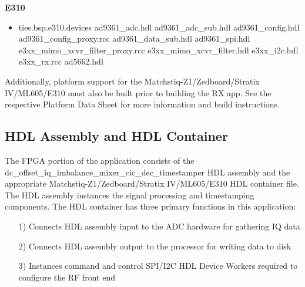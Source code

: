 	\begin{minipage}[t]{.33\textwidth}
	\textbf{E310}
	\begin{itemize}
		\item ties.bsp.e310.devices
			\subitem ad9361\_adc.hdl
			\subitem ad9361\_adc\_sub.hdl
			\subitem ad9361\_config.hdl
			\subitem ad9361\_config\_proxy.rcc
			\subitem ad9361\_data\_sub.hdl
			\subitem ad9361\_spi.hdl
			\subitem e3xx\_mimo\_xcvr\_filter\_proxy.rcc
			\subitem e3xx\_mimo\_xcvr\_filter.hdl
			\subitem e3xx\_i2c.hdl
			\subitem e3xx\_rx.rcc
			\subitem ad5662.hdl
	\end{itemize}
	\end{minipage} \medskip



\noindent Additionally, platform support for the Matchstiq-Z1/Zedboard/Stratix IV/ML605/E310 must also be built prior to building the RX app. See the respective Platform Data Sheet for more information and build instructions.
\newpage

\subsection{HDL Assembly and HDL Container}
The FPGA portion of the application consists of the dc\_offset\_iq\_imbalance\_mixer\_cic\_dec\_timestamper HDL assembly and the appropriate  Matchstiq-Z1/Zedboard/Stratix IV/ML605/E310 HDL container file. The HDL assembly instances the signal processing and timestamping components. The HDL container has three primary functions in this application:
\begin{itemize}
	\item[1)] Connects HDL assembly input to the ADC hardware for gathering IQ data
	\item[2)] Connects HDL assembly output to the processor for writing data to disk
	\item[3)] Instances command and control SPI/I2C HDL Device Workers required to configure the RF front end
\end{itemize}
